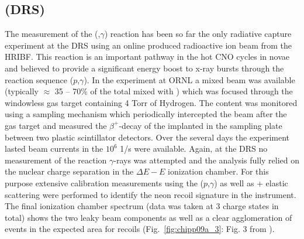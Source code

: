 \subsection{ (DRS) }
The measurement of the  (,$\gamma$) reaction has been so far the only radiative capture experiment at the DRS using an online produced radioactive ion beam from the HRIBF. This reaction is an important pathway in the hot CNO cycles in novae and believed to provide a significant energy boost to x-ray bursts through the reaction sequence ($p$,$\gamma$). In the experiment at ORNL a mixed  beam was available (typically  $\approx$ 35 -- 70\% of the total mixed with ) which was focused through the windowless gas target containing 4 Torr of Hydrogen. The  content was monitored using a sampling mechanism which periodically intercepted the beam after the gas target and measured the $\beta^+$-decay of the  implanted in the sampling plate between two plastic scintillator detectors. Over the several days the experiment lasted beam currents in the $10^6$ 1/s were available. Again, at the DRS no measurement of the reaction $\gamma$-rays was attempted and the analysis fully relied on the nuclear charge separation in the $\Delta{}E-E$ ionization chamber. For this purpose extensive calibration measurements using the ($p$,$\gamma$) as well as + elastic scattering were performed to identify the neon recoil signature in the instrument. The final ionization chamber spectrum (data was taken at 3 charge states in total) shows the two leaky beam components as well as a clear agglomeration of events in the expected area for  recoils (Fig.\ \ref{fig:chipp09a_3}: Fig. 3 from \cite{chip09a}).
